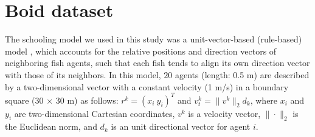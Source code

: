 \begin{table}[ht!]
\centering
{}
\caption{\label{tab:sensitivity} Sensitivity analysis on the carla dataset.}
\end{table}

\vspace{-10pt}
\section{Boid dataset}
\label{app:boid}
The schooling model we used in this study was a unit-vector-based (rule-based) model \cite{Couzin02}, which accounts for the relative positions and direction vectors of neighboring fish agents, such that each fish tends to align its own direction vector with those of its neighbors. 
In this model, $20$ agents (length: 0.5 m) are described by a two-dimensional vector with a constant velocity (1 m/s) in a boundary square (30 $\times$ 30 m) as follows: 
${r}^k=\left({x_i}~{y_i}\right)^T$ and ${v}^k_t= \|v^k\|_2d_k$, where $x_i$ and $y_i$ are two-dimensional Cartesian coordinates, ${v}^k$ is a velocity vector, $\|\cdot\|_2$ is the Euclidean norm, and $d_k$ is an unit directional vector for agent $i$.

